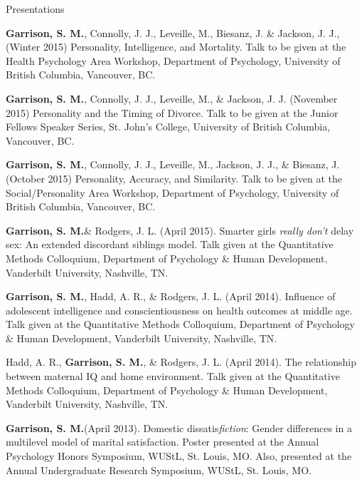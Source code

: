 \documentclass {resume}
\newlength{\wideitemsep}
\let\olditem\item
\renewcommand{\item}{\setlength{\itemsep}{\wideitemsep}\olditem}
\newcommand{\meb}{{\bf Garrison, S. M.}\xspace}
\begin{document}
\begin{rSection}{\textrm{Presentations}}
\begin{etaremune}
\item \meb, Connolly, J. J., Leveille, M., Biesanz, J. \& Jackson, J. J.,  (Winter 2015) Personality, Intelligence, and Mortality. Talk to be given at the Health Psychology Area Workshop, Department of Psychology, University of British Columbia, Vancouver, BC.
\item \meb, Connolly, J. J., Leveille, M., \& Jackson, J. J. (November 2015) Personality and the Timing of Divorce. Talk to be given at the Junior Fellows Speaker Series, St. John's College, University of British Columbia, Vancouver, BC.
\item \meb, Connolly, J. J., Leveille, M., Jackson, J. J., \& Biesanz, J. (October 2015) Personality, Accuracy, and Similarity. Talk to be given at the Social/Personality Area Workshop, Department of Psychology, University of British Columbia, Vancouver, BC.
\item\meb \& Rodgers, J. L. (April 2015). Smarter girls \textit{really don't} delay sex: An extended discordant siblings model. Talk given at the Quantitative Methods Colloquium, Department of Psychology \& Human Development, Vanderbilt University, Nashville, TN.
\item\meb, Hadd, A. R., \& Rodgers, J. L. (April 2014). Influence of adolescent intelligence and conscientiousness on health outcomes at middle age. Talk given at the Quantitative Methods Colloquium, Department of Psychology \& Human Development, Vanderbilt University, Nashville, TN.
\item Hadd, A. R., \meb, \& Rodgers, J. L. (April 2014). The relationship between maternal IQ and home environment. Talk given at the Quantitative Methods Colloquium, Department of Psychology \& Human Development, Vanderbilt University, Nashville, TN.
\item\meb (April 2013). Domestic dissatis{\em fiction}: Gender differences in a multilevel model of marital satisfaction. Poster presented at the Annual Psychology Honors Symposium, WUStL, St. Louis, MO. Also, presented at the Annual Undergraduate Research Symposium, WUStL, St. Louis, MO.
\end{etaremune}

\end{rSection}
\end{document}
